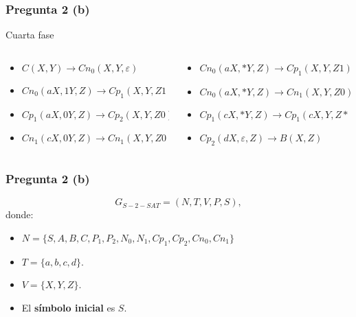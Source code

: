\documentclass{beamer}
\begin{document}
\begin{frame}
    \frametitle{Pregunta 2 (b)}
    
    \begin{block}{Cuarta fase}
        \begin{columns}
            \begin{column}{0.5\textwidth}
                \begin{itemize}
                    \item $C(X,Y)\to Cn_0(X,Y,\varepsilon)$
                          \pause 
                    \item $Cn_0(aX,1Y,Z)\to Cp_1(X,Y,Z1)$
                          \pause
                    \item $Cp_1(aX,0Y,Z)\to Cp_2(X,Y,Z0)$
                          \pause
                    \item $Cn_1(cX,0Y,Z)\to Cn_1(X,Y,Z0)$
                \end{itemize}
            \end{column}
            \pause
            \begin{column}{0.5\textwidth}
                \begin{itemize}   
                    \item $Cn_0(aX,*Y,Z)\to Cp_1(X,Y,Z1)$
                          \pause
                    \item $Cn_0(aX,*Y,Z)\to Cn_1(X,Y,Z0)$
                          \pause
                    \item $Cp_1(cX,*Y,Z)\to Cp_1(cX,Y,Z*)$
                          \pause
                    \item $Cp_2(dX,\varepsilon,Z)\to B(X,Z)$
                \end{itemize}
            \end{column}
        \end{columns}
    \end{block}
    
\end{frame}

\begin{frame}
    \frametitle{Pregunta 2 (b)}
    
    \[
        G_{S-2-SAT} = (N, T, V, P, S),
    \]
    donde:
    
    \begin{itemize}
        \item $N=\{S,A,B,C,P_1,P_2,N_0,N_1,Cp_1,Cp_2,Cn_0,Cn_1\}$
        \item $T=\{a,b,c,d\}$.
        \item $V=\{X,Y,Z\}$.
        \item El \textbf{símbolo inicial} es $S$.
    \end{itemize}
\end{frame}
\end{document}
